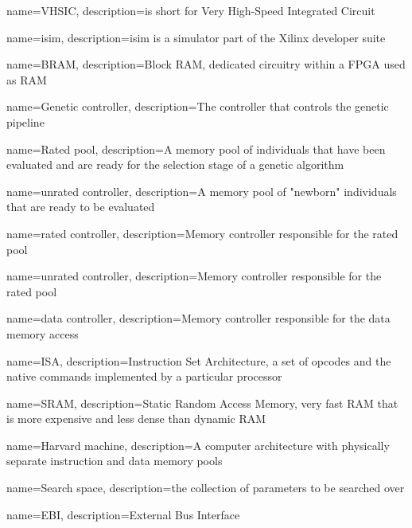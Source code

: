 {
name=VHSIC,
description={is short for Very High-Speed Integrated Circuit}
}

{
name=isim,
description={isim is a simulator part of the Xilinx developer suite}
}

{
name=BRAM,
description={Block RAM, dedicated circuitry within a FPGA used as RAM}
}

{
name=Genetic controller,
description={The controller that controls the genetic pipeline}
}

{
name=Rated pool,
description={A memory pool of individuals that have been evaluated and are ready for the selection stage of a genetic algorithm}
}

{
name=unrated controller,
description={A memory pool of "newborn" individuals that are ready to be evaluated}
}

{
name=rated controller,
description={Memory controller responsible for the rated pool}
}

{
name=unrated controller,
description={Memory controller responsible for the rated pool}
}

{
name=data controller,
description={Memory controller responsible for the data memory access}
}

{
name=ISA,
description={Instruction Set Architecture, a set of opcodes and the native commands implemented by a particular processor}
}

{
name=SRAM,
description={Static Random Access Memory, very fast RAM that is more expensive and less dense than dynamic RAM}
}

{
name=Harvard machine,
description={A computer architecture with physically separate instruction and data memory pools}
}

{
name=Search space,
description={the collection of parameters to be searched over}
}

{
name=EBI,
description={External Bus Interface}
}
